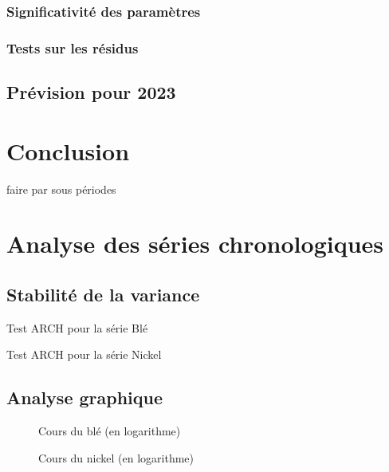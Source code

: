 \documentclass[11pt,a4paper]{article}
\begin{document}
\subsubsection{Significativité des paramètres}
\subsubsection{Tests sur les résidus}
\subsection{Prévision pour 2023}
\section*{Conclusion}


faire par sous périodes


\appendix
\renewcommand\thefigure{\thesubsubsection.\arabic{table}}
\renewcommand\thetable{\thesubsubsection.\arabic{figure}}    
\section{Analyse des séries chronologiques}
\subsection{Stabilité de la variance}\label{appendix:hetero}
\begin{table}[H]
    \sffamily
    \centering
    \label{tab:hetero_ble}
    
    \caption{Test ARCH pour la série Blé}
\end{table}
\begin{table}[H]
    \sffamily
    \centering
    \label{tab:hetero_nickel}
    
    \caption{Test ARCH pour la série Nickel}
\end{table}
\subsection{Analyse graphique}\label{appendix:loggraph}
\begin{figure}[H]
    \centering
    \label{fig:ble_log}
    \resizebox{0.6\textwidth}{!}{}
    \caption{Cours du blé (en logarithme)}
\end{figure}
\begin{figure}[H]
    \centering
    \label{fig:nickel_log}
    \resizebox{0.6\textwidth}{!}{}
    \caption{Cours du nickel (en logarithme)}
\end{figure}
\end{document}
